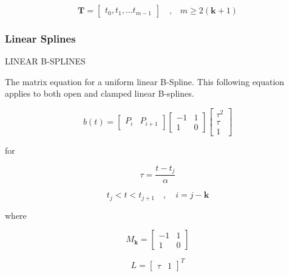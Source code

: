 \documentclass{article}
\begin{document}
    \begin{equation}
        \textbf{T} = \begin{bmatrix} t_0, t_1, ... t_{m-1} \end{bmatrix} \quad \text{,} \quad m \geq 2(\textbf{k} + 1)
    \end{equation}

\subsubsection{Linear Splines}

LINEAR B-SPLINES
\hfill \break

    The matrix equation for a uniform linear B-Spline. This following equation applies to both open and clamped linear B-splines.
    
    \begin{equation}
        b(t) = \begin{bmatrix} P_i & P_{i+1} \end{bmatrix} \begin{bmatrix} -1 & 1 \\ 1 & 0
        \end{bmatrix} \begin{bmatrix} \tau^2 \\ \tau \\ 1 \end{bmatrix}
    \end{equation}
    
    for
    
    \begin{equation}
        \tau = \frac{t-t_j}{\alpha}
    \end{equation}
    
    \begin{equation}
        t_j < t < t_{j+1} \quad , \quad i = j-\textbf{k}
    \end{equation}
    
    where 
    
    \begin{equation}
    M_{\textbf{k}} = \begin{bmatrix} -1 & 1 \\ 1 & 0
        \end{bmatrix}
    \end{equation}
    
    \begin{equation}
        L = \begin{bmatrix} \tau & 1 \end{bmatrix}^{T}
    \end{equation}
    
\end{document}
